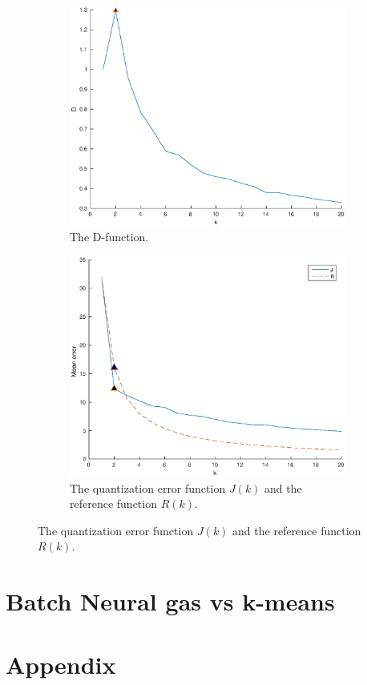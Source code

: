 \documentclass[10pt]{article}
\begin{document}
\begin{figure}[H]
  \centering
  \caption{Results for $kmax = 20$}
  \begin{subfigure}[b]{.45\textwidth}
    \includegraphics[width=\columnwidth]{Fig3.eps}
    \caption{The D-function.}
  \end{subfigure}
  \quad
  \begin{subfigure}[b]{.45\textwidth}
    \includegraphics[width=\columnwidth]{Fig4.eps}
    \caption{The quantization error function $J(k)$ and the reference function $R(k)$.}
  \end{subfigure}
  \label{fig2.1}
\end{figure}

\section{Batch Neural gas vs k-means}

\section*{Appendix}
{\label{kmeans}}
{\label{runKMeans}}
\end{document}
